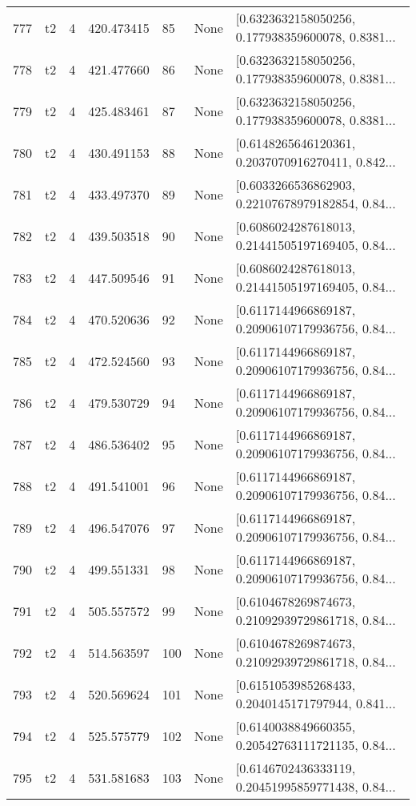 \begin{tabular}{lllrlll}
777 &  t2 &   4 &   420.473415 &   85 &  None &  [0.6323632158050256, 0.177938359600078, 0.8381... \\
778 &  t2 &   4 &   421.477660 &   86 &  None &  [0.6323632158050256, 0.177938359600078, 0.8381... \\
779 &  t2 &   4 &   425.483461 &   87 &  None &  [0.6323632158050256, 0.177938359600078, 0.8381... \\
780 &  t2 &   4 &   430.491153 &   88 &  None &  [0.6148265646120361, 0.2037070916270411, 0.842... \\
781 &  t2 &   4 &   433.497370 &   89 &  None &  [0.6033266536862903, 0.22107678979182854, 0.84... \\
782 &  t2 &   4 &   439.503518 &   90 &  None &  [0.6086024287618013, 0.21441505197169405, 0.84... \\
783 &  t2 &   4 &   447.509546 &   91 &  None &  [0.6086024287618013, 0.21441505197169405, 0.84... \\
784 &  t2 &   4 &   470.520636 &   92 &  None &  [0.6117144966869187, 0.20906107179936756, 0.84... \\
785 &  t2 &   4 &   472.524560 &   93 &  None &  [0.6117144966869187, 0.20906107179936756, 0.84... \\
786 &  t2 &   4 &   479.530729 &   94 &  None &  [0.6117144966869187, 0.20906107179936756, 0.84... \\
787 &  t2 &   4 &   486.536402 &   95 &  None &  [0.6117144966869187, 0.20906107179936756, 0.84... \\
788 &  t2 &   4 &   491.541001 &   96 &  None &  [0.6117144966869187, 0.20906107179936756, 0.84... \\
789 &  t2 &   4 &   496.547076 &   97 &  None &  [0.6117144966869187, 0.20906107179936756, 0.84... \\
790 &  t2 &   4 &   499.551331 &   98 &  None &  [0.6117144966869187, 0.20906107179936756, 0.84... \\
791 &  t2 &   4 &   505.557572 &   99 &  None &  [0.6104678269874673, 0.21092939729861718, 0.84... \\
792 &  t2 &   4 &   514.563597 &  100 &  None &  [0.6104678269874673, 0.21092939729861718, 0.84... \\
793 &  t2 &   4 &   520.569624 &  101 &  None &  [0.6151053985268433, 0.2040145171797944, 0.841... \\
794 &  t2 &   4 &   525.575779 &  102 &  None &  [0.6140038849660355, 0.20542763111721135, 0.84... \\
795 &  t2 &   4 &   531.581683 &  103 &  None &  [0.6146702436333119, 0.20451995859771438, 0.84... \\

\end{tabular}
